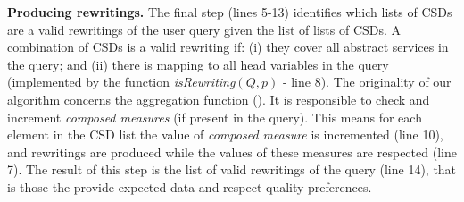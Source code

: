 \noindent \textbf{Producing rewritings.} The final step (lines 5-13) identifies which lists of CSDs are a valid
rewritings of the user query given the list of lists of CSDs.
A combination of CSDs is a valid rewriting if: (i) they cover all abstract services in the query; and 
(ii) there is mapping to all head variables in the query (implemented by the function \textit{isRewriting}$(Q, p)$ - line 8).
The originality of our algorithm concerns the aggregation function ().
It is responsible to check and increment \textit{composed measures} (if present in the query). 
This means for each element in the CSD list the value of \textit{composed measure} is incremented (line 10), and rewritings are produced while the values of these measures are respected (line 7). 
The result of this step is the list of valid 
 rewritings of the query (line 14), that is those the provide expected data and respect quality preferences.



